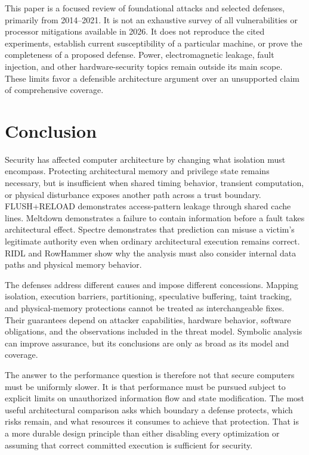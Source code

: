 \documentclass[man,12pt,apacite,nofontenc,nolmodern,floatsintext]{apa6}
\begin{document}
This paper is a focused review of foundational attacks and selected defenses, primarily from 2014--2021. It is not an exhaustive survey of all vulnerabilities or processor mitigations available in 2026. It does not reproduce the cited experiments, establish current susceptibility of a particular machine, or prove the completeness of a proposed defense. Power, electromagnetic leakage, fault injection, and other hardware-security topics remain outside its main scope. These limits favor a defensible architecture argument over an unsupported claim of comprehensive coverage.

\section{Conclusion}
Security has affected computer architecture by changing what isolation must encompass. Protecting architectural memory and privilege state remains necessary, but is insufficient when shared timing behavior, transient computation, or physical disturbance exposes another path across a trust boundary. FLUSH+RELOAD demonstrates access-pattern leakage through shared cache lines. Meltdown demonstrates a failure to contain information before a fault takes architectural effect. Spectre demonstrates that prediction can misuse a victim's legitimate authority even when ordinary architectural execution remains correct. RIDL and RowHammer show why the analysis must also consider internal data paths and physical memory behavior.

The defenses address different causes and impose different concessions. Mapping isolation, execution barriers, partitioning, speculative buffering, taint tracking, and physical-memory protections cannot be treated as interchangeable fixes. Their guarantees depend on attacker capabilities, hardware behavior, software obligations, and the observations included in the threat model. Symbolic analysis can improve assurance, but its conclusions are only as broad as its model and coverage.

The answer to the performance question is therefore not that secure computers must be uniformly slower. It is that performance must be pursued subject to explicit limits on unauthorized information flow and state modification. The most useful architectural comparison asks which boundary a defense protects, which risks remain, and what resources it consumes to achieve that protection. That is a more durable design principle than either disabling every optimization or assuming that correct committed execution is sufficient for security.


\end{document}
